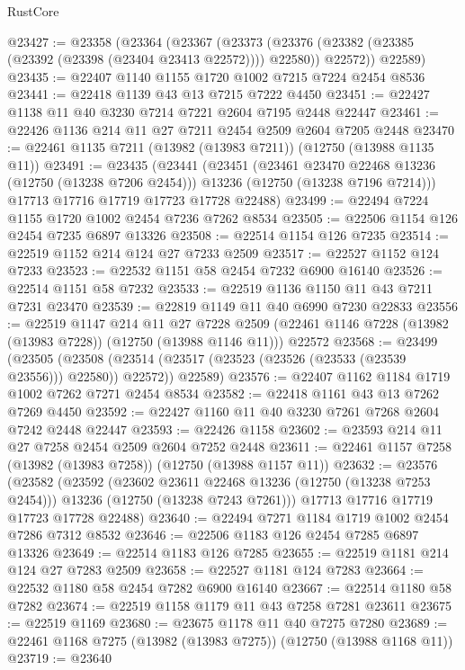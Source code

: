 \begin{lexlean}{RustCore}
\begin{coremodule}
@23427 := @23358
    (@23364
      (@23367
        (@23373 (@23376 (@23382 (@23385 (@23392 (@23398 (@23404 @23413 @22572)))) @22580)) @22572))
      @22589)
@23435 := @22407 @1140 @1155 @1720 @1002 @7215 @7224 @2454 @8536
@23441 := @22418 @1139 @43 @13 @7215 @7222 @4450
@23451 := @22427 @1138 @11 @40 @3230 @7214 @7221 @2604 @7195 @2448 @22447
@23461 := @22426 @1136 @214 @11 @27 @7211 @2454 @2509 @2604 @7205 @2448
@23470 := @22461 @1135 @7211 (@13982 (@13983 @7211)) (@12750 (@13988 @1135 @11))
@23491 := @23435
    (@23441
      (@23451
        (@23461 @23470 @22468 @13236 (@12750 (@13238 @7206 @2454)))
        @13236
        (@12750 (@13238 @7196 @7214)))
      @17713
      @17716
      @17719
      @17723
      @17728
      @22488)
@23499 := @22494 @7224 @1155 @1720 @1002 @2454 @7236 @7262 @8534
@23505 := @22506 @1154 @126 @2454 @7235 @6897 @13326
@23508 := @22514 @1154 @126 @7235
@23514 := @22519 @1152 @214 @124 @27 @7233 @2509
@23517 := @22527 @1152 @124 @7233
@23523 := @22532 @1151 @58 @2454 @7232 @6900 @16140
@23526 := @22514 @1151 @58 @7232
@23533 := @22519 @1136 @1150 @11 @43 @7211 @7231 @23470
@23539 := @22819 @1149 @11 @40 @6990 @7230 @22833
@23556 := @22519
    @1147
    @214
    @11
    @27
    @7228
    @2509
    (@22461 @1146 @7228 (@13982 (@13983 @7228)) (@12750 (@13988 @1146 @11)))
    @22572
@23568 := @23499
    (@23505
      (@23508 (@23514 (@23517 (@23523 (@23526 (@23533 (@23539 @23556))) @22580)) @22572))
      @22589)
@23576 := @22407 @1162 @1184 @1719 @1002 @7262 @7271 @2454 @8534
@23582 := @22418 @1161 @43 @13 @7262 @7269 @4450
@23592 := @22427 @1160 @11 @40 @3230 @7261 @7268 @2604 @7242 @2448 @22447
@23593 := @22426 @1158
@23602 := @23593 @214 @11 @27 @7258 @2454 @2509 @2604 @7252 @2448
@23611 := @22461 @1157 @7258 (@13982 (@13983 @7258)) (@12750 (@13988 @1157 @11))
@23632 := @23576
    (@23582
      (@23592
        (@23602 @23611 @22468 @13236 (@12750 (@13238 @7253 @2454)))
        @13236
        (@12750 (@13238 @7243 @7261)))
      @17713
      @17716
      @17719
      @17723
      @17728
      @22488)
@23640 := @22494 @7271 @1184 @1719 @1002 @2454 @7286 @7312 @8532
@23646 := @22506 @1183 @126 @2454 @7285 @6897 @13326
@23649 := @22514 @1183 @126 @7285
@23655 := @22519 @1181 @214 @124 @27 @7283 @2509
@23658 := @22527 @1181 @124 @7283
@23664 := @22532 @1180 @58 @2454 @7282 @6900 @16140
@23667 := @22514 @1180 @58 @7282
@23674 := @22519 @1158 @1179 @11 @43 @7258 @7281 @23611
@23675 := @22519 @1169
@23680 := @23675 @1178 @11 @40 @7275 @7280
@23689 := @22461 @1168 @7275 (@13982 (@13983 @7275)) (@12750 (@13988 @1168 @11))
@23719 := @23640

\end{coremodule}
\end{lexlean}
